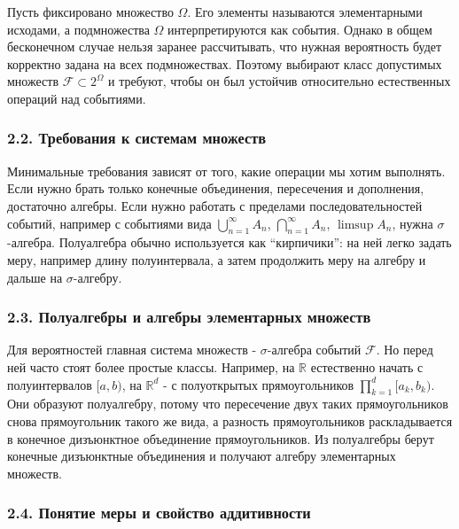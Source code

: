 \documentclass[
  11pt,
  a4paper,
]{article}
\begin{document}
Пусть фиксировано множество \(\Omega\). Его элементы называются
элементарными исходами, а подмножества \(\Omega\) интерпретируются как
события. Однако в общем бесконечном случае нельзя заранее рассчитывать,
что нужная вероятность будет корректно задана на всех подмножествах.
Поэтому выбирают класс допустимых множеств
\(\mathcal F\subset 2^\Omega\) и требуют, чтобы он был устойчив
относительно естественных операций над событиями.

\subsubsection{2.2. Требования к системам
множеств}\label{ux442ux440ux435ux431ux43eux432ux430ux43dux438ux44f-ux43a-ux441ux438ux441ux442ux435ux43cux430ux43c-ux43cux43dux43eux436ux435ux441ux442ux432}

Минимальные требования зависят от того, какие операции мы хотим
выполнять. Если нужно брать только конечные объединения, пересечения и
дополнения, достаточно алгебры. Если нужно работать с пределами
последовательностей событий, например с событиями вида
\(\bigcup_{n=1}^{\infty}A_n\), \(\bigcap_{n=1}^{\infty}A_n\),
\(\limsup A_n\), нужна \(\sigma\)-алгебра. Полуалгебра обычно
используется как ``кирпичики'': на ней легко задать меру, например длину
полуинтервала, а затем продолжить меру на алгебру и дальше на
\(\sigma\)-алгебру.

\subsubsection{2.3. Полуалгебры и алгебры элементарных
множеств}\label{ux43fux43eux43bux443ux430ux43bux433ux435ux431ux440ux44b-ux438-ux430ux43bux433ux435ux431ux440ux44b-ux44dux43bux435ux43cux435ux43dux442ux430ux440ux43dux44bux445-ux43cux43dux43eux436ux435ux441ux442ux432}

Для вероятностей главная система множеств - \(\sigma\)-алгебра событий
\(\mathcal F\). Но перед ней часто стоят более простые классы. Например,
на \(\mathbb R\) естественно начать с полуинтервалов \([a,b)\), на
\(\mathbb R^d\) - с полуоткрытых прямоугольников
\(\prod_{k=1}^d[a_k,b_k)\). Они образуют полуалгебру, потому что
пересечение двух таких прямоугольников снова прямоугольник такого же
вида, а разность прямоугольников раскладывается в конечное дизъюнктное
объединение прямоугольников. Из полуалгебры берут конечные дизъюнктные
объединения и получают алгебру элементарных множеств.

\subsubsection{2.4. Понятие меры и свойство
аддитивности}\label{ux43fux43eux43dux44fux442ux438ux435-ux43cux435ux440ux44b-ux438-ux441ux432ux43eux439ux441ux442ux432ux43e-ux430ux434ux434ux438ux442ux438ux432ux43dux43eux441ux442ux438}
\end{document}
